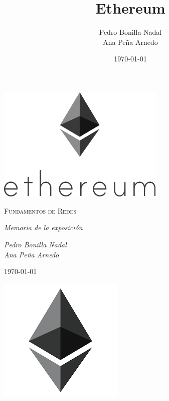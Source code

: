 \documentclass[11pt,a4paper]{article}
\title{Ethereum}
\author{Pedro Bonilla Nadal\\Ana Peña Arnedo}
\date{\today}
\begin{document}
\begin{titlepage}
  \centering
  
  \vspace{10cm}
  \includegraphics[width=0.6\textwidth]{./images/portada.png}\par\vspace{1cm}
                  {\scshape\large Fundamentos de Redes \par} \vspace{1cm}
                  \vspace{0.4cm}
                         {\large\itshape Memoria de la exposición\\}
                         \vspace{0.6cm}
                                {\large\itshape  Pedro Bonilla Nadal\\Ana Peña Arnedo \par} \vspace{1.00cm}

                                \vfill
                                    {\large \today\par}

\end{titlepage}
\begin{center}
  \includegraphics[scale=.42]{images/logo.png}
\end{center}
\end{document}
